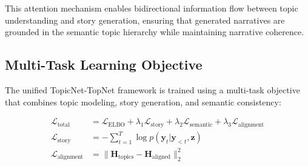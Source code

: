 \documentclass{article}
\begin{document}
This attention mechanism enables bidirectional information flow between topic understanding and story generation, ensuring that generated narratives are grounded in the semantic topic hierarchy while maintaining narrative coherence.

\subsection{Multi-Task Learning Objective}

The unified TopicNet-TopNet framework is trained using a multi-task objective that combines topic modeling, story generation, and semantic consistency:

\begin{equation} \label{unified_objective}
\begin{split}
\mathcal{L}_{\text{total}} &= \mathcal{L}_{\text{ELBO}} + \lambda_1 \mathcal{L}_{\text{story}} + \lambda_2 \mathcal{L}_{\text{semantic}} + \lambda_3 \mathcal{L}_{\text{alignment}} \\
\mathcal{L}_{\text{story}} &= -\sum_{t=1}^T \log p(\bm{y}_t | \bm{y}_{<t}, \bm{z}) \\
\mathcal{L}_{\text{alignment}} &= \|\bm{H}_{\text{topics}} - \bm{H}_{\text{aligned}}\|_2^2
\end{split}
\end{equation}
\end{document}
